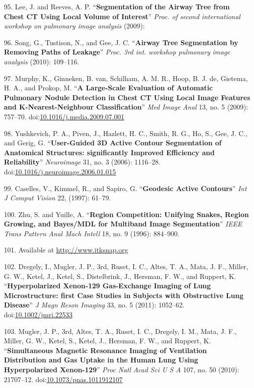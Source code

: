 \documentclass[11pt,]{article}
\begin{document}
95. Lee, J. and Reeves, A. P. ``\textbf{Segmentation of the Airway Tree
from Chest CT Using Local Volume of Interest}'' \emph{Proc. of second
international workshop on pulmonary image analysis} (2009):

96. Song, G., Tustison, N., and Gee, J. C. ``\textbf{Airway Tree
Segmentation by Removing Paths of Leakage}'' \emph{Proc. 3rd int.
workshop pulmonary image analysis} (2010): 109--116.

97. Murphy, K., Ginneken, B. van, Schilham, A. M. R., Hoop, B. J. de,
Gietema, H. A., and Prokop, M. ``\textbf{A Large-Scale Evaluation of
Automatic Pulmonary Nodule Detection in Chest CT Using Local Image
Features and K-Nearest-Neighbour Classification}'' \emph{Med Image Anal}
13, no. 5 (2009): 757--70.
doi:\href{http://dx.doi.org/10.1016/j.media.2009.07.001}{10.1016/j.media.2009.07.001}

98. Yushkevich, P. A., Piven, J., Hazlett, H. C., Smith, R. G., Ho, S.,
Gee, J. C., and Gerig, G. ``\textbf{User-Guided 3D Active Contour
Segmentation of Anatomical Structures: significantly Improved Efficiency
and Reliability}'' \emph{Neuroimage} 31, no. 3 (2006): 1116--28.
doi:\href{http://dx.doi.org/10.1016/j.neuroimage.2006.01.015}{10.1016/j.neuroimage.2006.01.015}

99. Caselles, V., Kimmel, R., and Sapiro, G. ``\textbf{Geodesic Active
Contours}'' \emph{Int J Comput Vision} 22, (1997): 61--79.

100. Zhu, S. and Yuille, A. ``\textbf{Region Competition: Unifying
Snakes, Region Growing, and Bayes/MDL for Multiband Image
Segmentation}'' \emph{IEEE Trans Pattern Anal Mach Intell} 18, no. 9
(1996): 884--900.

101. Available at \url{http://www.itksnap.org}

102. Dregely, I., Mugler, J. P., 3rd, Ruset, I. C., Altes, T. A., Mata,
J. F., Miller, G. W., Ketel, J., Ketel, S., Distelbrink, J., Hersman, F.
W., and Ruppert, K. ``\textbf{Hyperpolarized Xenon-129 Gas-Exchange
Imaging of Lung Microstructure: first Case Studies in Subjects with
Obstructive Lung Disease}'' \emph{J Magn Reson Imaging} 33, no. 5
(2011): 1052--62.
doi:\href{http://dx.doi.org/10.1002/jmri.22533}{10.1002/jmri.22533}

103. Mugler, J. P., 3rd, Altes, T. A., Ruset, I. C., Dregely, I. M.,
Mata, J. F., Miller, G. W., Ketel, S., Ketel, J., Hersman, F. W., and
Ruppert, K. ``\textbf{Simultaneous Magnetic Resonance Imaging of
Ventilation Distribution and Gas Uptake in the Human Lung Using
Hyperpolarized Xenon-129}'' \emph{Proc Natl Acad Sci U S A} 107, no. 50
(2010): 21707--12.
doi:\href{http://dx.doi.org/10.1073/pnas.1011912107}{10.1073/pnas.1011912107}
\end{document}
